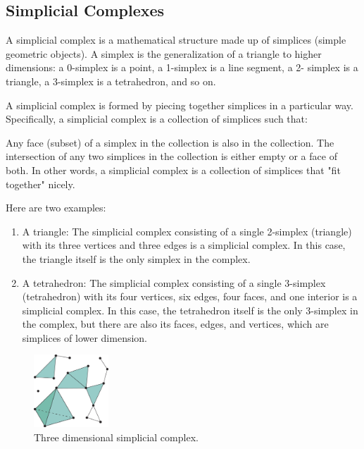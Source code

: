 \documentclass{IEEEcsmag}
\begin{document}
  \subsection{Simplicial Complexes}
    A simplicial complex is a mathematical structure made up of simplices (simple geometric objects). A simplex is the 
    generalization of a triangle to higher dimensions: a 0-simplex is a point, a 1-simplex is a line segment, a 2-
    simplex is a triangle, a 3-simplex is a tetrahedron, and so on.

    A simplicial complex is formed by piecing together simplices in a particular way. Specifically, a simplicial 
    complex is a collection of simplices such that:

    Any face (subset) of a simplex in the collection is also in the collection.
    The intersection of any two simplices in the collection is either empty or a face of both.
    In other words, a simplicial complex is a collection of simplices that "fit together" nicely.

    Here are two examples:

    \begin{enumerate}
        \item A triangle: The simplicial complex consisting of a single 2-simplex (triangle) with its three vertices 
        and three edges is a simplicial complex. In this case, the triangle itself is the only simplex in the complex.
        
        \item A tetrahedron: The simplicial complex consisting of a single 3-simplex (tetrahedron) with its four 
        vertices, six edges, four faces, and one interior is a simplicial complex. In this case, the tetrahedron 
        itself is the only 3-simplex in the complex, but there are also its faces, edges, and vertices, which are 
        simplices of lower dimension.
    \end{enumerate}
    
    \begin{figure}
        \centering
        \includegraphics[width=0.25\textwidth]{simp_complex.png}
        \caption{Three dimensional simplicial complex.}
    \end{figure}
\end{document}
